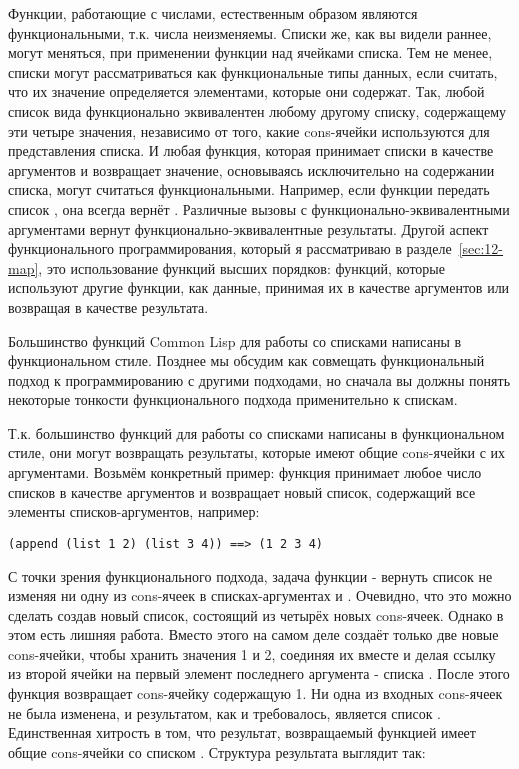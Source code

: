 Функции, работающие с числами, естественным образом являются функциональными, т.к. числа
неизменяемы. Списки же, как вы видели раннее, могут меняться, при применении функции
 над ячейками списка. Тем не менее, списки могут рассматриваться как
функциональные типы данных, если считать, что их значение определяется элементами, которые
они содержат. Так, любой список вида  функционально эквивалентен любому
другому списку, содержащему эти четыре значения, независимо от того, какие cons-ячейки
используются для представления списка. И любая функция, которая принимает списки в
качестве аргументов и возвращает значение, основываясь исключительно на содержании списка,
могут считаться функциональными. Например, если функции  передать список
, она всегда вернёт . Различные вызовы  с
функционально-эквивалентными аргументами вернут функционально-эквивалентные
результаты. Другой аспект функционального программирования, который я рассматриваю в
разделе~\ref{sec:12-map}, это использование функций высших порядков: функций, которые
используют другие функции, как данные, принимая их в качестве аргументов или возвращая в
качестве результата.

Большинство функций Common Lisp для работы со списками написаны в функциональном
стиле. Позднее мы обсудим как совмещать функциональный подход к программированию с другими
подходами, но сначала вы должны понять некоторые тонкости функционального подхода
применительно к спискам.

Т.к. большинство функций для работы со списками написаны в функциональном стиле, они могут
возвращать результаты, которые имеют общие cons-ячейки с их аргументами. Возьмём
конкретный пример: функция  принимает любое число списков в качестве
аргументов и возвращает новый список, содержащий все элементы списков-аргументов,
например:

\begin{lstlisting}
(append (list 1 2) (list 3 4)) ==> (1 2 3 4)
\end{lstlisting}

С точки зрения функционального подхода, задача функции  - вернуть список
 не изменяя ни одну из cons-ячеек в списках-аргументах  и
. Очевидно, что это можно сделать создав новый список, состоящий из четырёх
новых cons-ячеек. Однако в этом есть лишняя работа. Вместо этого  на самом
деле создаёт только две новые cons-ячейки, чтобы хранить значения 1 и 2, соединяя их
вместе и делая ссылку из  второй ячейки на первый элемент последнего аргумента -
списка . После этого функция возвращает cons-ячейку содержащую 1. Ни одна из
входных cons-ячеек не была изменена, и результатом, как и требовалось, является список
. Единственная хитрость в том, что результат, возвращаемый функцией
 имеет общие cons-ячейки со списком . Структура результата
выглядит так:

